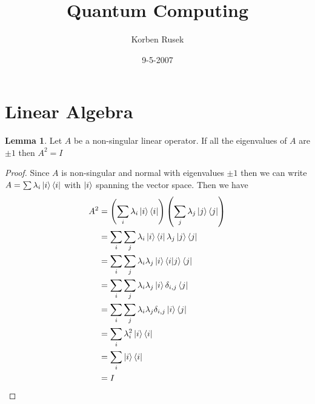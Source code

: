 \documentclass{article}
\author{Korben Rusek}
\title{Quantum Computing}
\date{9-5-2007}
\begin{document}
\maketitle
\newcommand{\gindex}[2]{|#1\!:\!#2|}
\newcommand{\lcm}{\textrm{lcm}}
\newcommand{\irr}{\textrm{irr}}
\newcommand{\sylp}{$Syl_{p}$}
\newcommand{\phnt}[1]{$\phantom{1}^{#1}$}
\newcommand{\gen}[1]{\langle#1\rangle}
\newcommand{\BN}{\mathbb{N}}
\newcommand{\BZ}{\mathbb{Z}}
\newcommand{\BQ}{\mathbb{Q}}
\newcommand{\BR}{\mathbb{R}}
\newcommand{\BC}{\mathbb{C}}
\newcommand{\BF}{\mathbb{F}}
\newcommand{\CF}{\mathcal{F}}
\newcommand{\CQ}{\mathcal{Q}}
\newcommand{\fa}{\mathfrak{a}}
\newcommand{\fb}{\mathfrak{b}}
\newcommand{\fp}{\mathfrak{p}}
\newcommand{\fq}{\mathfrak{q}}
\newcommand{\fm}{\mathfrak{m}}
\newcommand{\FN}{\mathfrak{N}}
\newcommand{\FR}{\mathfrak{R}}
\newcommand{\set}[1]{\{#1\}}
\newcommand{\trv}{\set{1}}
\newcommand{\Aut}{\mathrm{Aut}}
\newcommand{\End}{\mathrm{End}}
\newcommand{\Ker}{\mathrm{Ker}}
\newcommand{\chr}{\mathrm{char}}

\theoremstyle{definition}
\newtheorem{theorem}{Theorem}[section]
\newtheorem{definition}[theorem]{Definition}
\newtheorem{lemma}[theorem]{Lemma}
\newtheorem{exercise}{Exercise}[section]

\setcounter{section}{1}
\section{Linear Algebra}
\begin{lemma}
  Let $A$ be a non-singular linear operator.
  If all the eigenvalues of $A$ are $\pm 1$ then $A^2=I$
  \begin{proof}
    Since $A$ is non-singular and normal with eigenvalues $\pm1$ then we
    can write $A=\sum\lambda_i\ket{i}\bra{i}$ with $\ket{i}$ spanning the
    vector space. Then we
    have
    \begin{align*}
      A^2&=\left(\sum_i\lambda_i\ket{i}\bra{i}\right)\left(\sum_j\lambda_j\ket{j}\bra{j}\right) \\
      &=\sum_i\sum_j\lambda_i\ket{i}\bra{i}\lambda_j\ket{j}\bra{j} \\
      &=\sum_i\sum_j\lambda_i\lambda_j\ket{i}\bra{i}\ket{j}\bra{j} \\
      &=\sum_i\sum_j\lambda_i\lambda_j\ket{i}\delta_{i,j}\bra{j} \\
      &=\sum_i\sum_j\lambda_i\lambda_j\delta_{i,j}\ket{i}\bra{j} \\
      &=\sum_i\lambda_i^2\ket{i}\bra{i} \\
      &=\sum_i\ket{i}\bra{i} \\
      &=I
    \end{align*}
  \end{proof}
\end{lemma}
\end{document}
